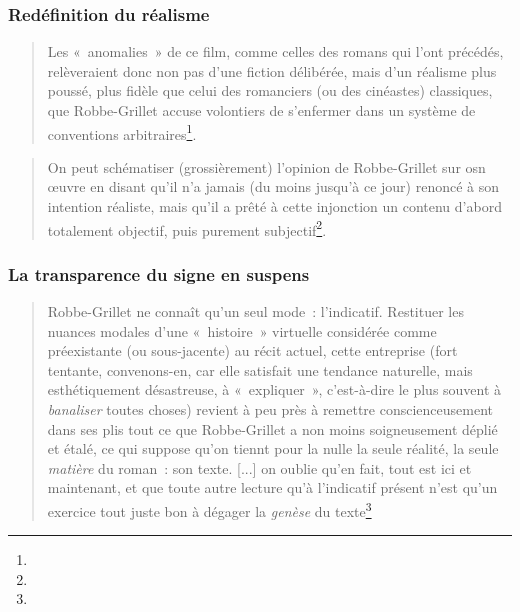 \documentclass[12pt, a4paper]{article}
\begin{document}
\subsubsection{Redéfinition du réalisme}
\begin{quote}
    Les 
«~anomalies~» de ce film, comme celles des romans qui l'ont précédés, relèveraient donc non pas d'une fiction délibérée, mais d'un réalisme plus poussé, plus fidèle que celui des romanciers (ou des cinéastes) classiques, que Robbe-Grillet accuse volontiers de s'enfermer dans un système de conventions arbitraires\footnote{}.
    
\end{quote}

\begin{quote}
    On peut schématiser (grossièrement) l'opinion de Robbe-Grillet sur osn œuvre en disant qu'il n'a jamais (du moins jusqu'à ce jour) renoncé à son intention réaliste, mais qu'il a prêté à cette injonction un contenu d'abord totalement objectif, puis purement subjectif\footnote{}.
\end{quote}



\subsubsection{La transparence du signe en suspens}
\begin{quote}
    Robbe-Grillet ne connaît qu'un seul mode~: l'indicatif. Restituer les nuances modales d'une «~histoire~» virtuelle considérée comme préexistante (ou sous-jacente) au récit actuel, cette entreprise (fort tentante, convenons-en, car elle satisfait une tendance naturelle, mais esthétiquement désastreuse, à «~expliquer~», c'est-à-dire le plus souvent à \textit{banaliser} toutes choses) revient à peu près à remettre conscienceusement dans ses plis tout ce que Robbe-Grillet a non moins soigneusement déplié et étalé, ce qui suppose qu'on tiennt pour la nulle la seule réalité, la seule \textit{matière} du roman~: son texte. [...] on oublie qu'en fait, tout est ici et maintenant, et que toute autre lecture qu'à l'indicatif présent n'est qu'un exercice tout juste bon à dégager la \textit{genèse} du texte\footnote{}
\end{quote}
\end{document}
